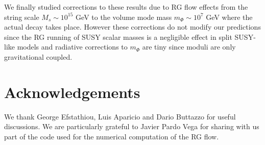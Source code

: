 \documentclass[11pt,a4paper]{article}
\begin{document}
We finally studied corrections to these results due to RG flow effects from the string scale $M_s \sim 10^{15}$ GeV to the volume mode mass $m_\Phi\sim 10^7$ GeV where the actual decay takes place. However these corrections do not modify our predictions since the RG running of SUSY scalar masses is a negligible effect in split SUSY-like models and radiative corrections to $m_\Phi$ are tiny since moduli are only gravitational coupled. 

\section*{Acknowledgements}

We thank George Efstathiou, Luis Aparicio and Dario Buttazzo for useful discussions. We are particularly grateful to Javier Pardo Vega for sharing with us part of the code used for the numerical computation of the RG flow.
\end{document}
